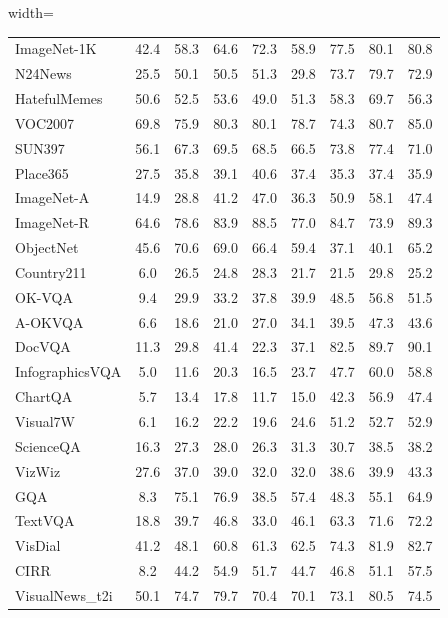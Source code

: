 \begin{table}[!ht]
\begin{adjustbox}{width=\textwidth}
\begin{tabular}{l|cccccccc}
        ImageNet-1K & 42.4 & 58.3 & 64.6 & 72.3 & 58.9 & 77.5 & 80.1 & 80.8 \\ 
        N24News & 25.5 & 50.1 & 50.5 & 51.3 & 29.8 & 73.7 & 79.7 & 72.9 \\ 
        HatefulMemes & 50.6 & 52.5 & 53.6 & 49.0 & 51.3 & 58.3 & 69.7 & 56.3 \\ 
        VOC2007 & 69.8 & 75.9 & 80.3 & 80.1 & 78.7 & 74.3 & 80.7 & 85.0 \\ 
        SUN397 & 56.1 & 67.3 & 69.5 & 68.5 & 66.5 & 73.8 & 77.4 & 71.0 \\ 
        Place365 & 27.5 & 35.8 & 39.1 & 40.6 & 37.4 & 35.3 & 37.4 & 35.9 \\ 
        ImageNet-A & 14.9 & 28.8 & 41.2 & 47.0 & 36.3 & 50.9 & 58.1 & 47.4 \\ 
        ImageNet-R & 64.6 & 78.6 & 83.9 & 88.5 & 77.0 & 84.7 & 73.9 & 89.3 \\ 
        ObjectNet & 45.6 & 70.6 & 69.0 & 66.4 & 59.4 & 37.1 & 40.1 & 65.2 \\ 
        Country211 & 6.0 & 26.5 & 24.8 & 28.3 & 21.7 & 21.5 & 29.8 & 25.2 \\ 
        OK-VQA & 9.4 & 29.9 & 33.2 & 37.8 & 39.9 & 48.5 & 56.8 & 51.5 \\ 
        A-OKVQA & 6.6 & 18.6 & 21.0 & 27.0 & 34.1 & 39.5 & 47.3 & 43.6 \\ 
        DocVQA & 11.3 & 29.8 & 41.4 & 22.3 & 37.1 & 82.5 & 89.7 & 90.1 \\ 
        InfographicsVQA & 5.0 & 11.6 & 20.3 & 16.5 & 23.7 & 47.7 & 60.0 & 58.8 \\ 
        ChartQA & 5.7 & 13.4 & 17.8 & 11.7 & 15.0 & 42.3 & 56.9 & 47.4 \\ 
        Visual7W & 6.1 & 16.2 & 22.2 & 19.6 & 24.6 & 51.2 & 52.7 & 52.9 \\ 
        ScienceQA & 16.3 & 27.3 & 28.0 & 26.3 & 31.3 & 30.7 & 38.5 & 38.2 \\ 
        VizWiz & 27.6 & 37.0 & 39.0 & 32.0 & 32.0 & 38.6 & 39.9 & 43.3 \\ 
        GQA & 8.3 & 75.1 & 76.9 & 38.5 & 57.4 & 48.3 & 55.1 & 64.9 \\ 
        TextVQA & 18.8 & 39.7 & 46.8 & 33.0 & 46.1 & 63.3 & 71.6 & 72.2 \\ 
        VisDial & 41.2 & 48.1 & 60.8 & 61.3 & 62.5 & 74.3 & 81.9 & 82.7 \\ 
        CIRR & 8.2 & 44.2 & 54.9 & 51.7 & 44.7 & 46.8 & 51.1 & 57.5 \\ 
        VisualNews\_t2i & 50.1 & 74.7 & 79.7 & 70.4 & 70.1 & 73.1 & 80.5 & 74.5 \\ 

\end{tabular}
\end{adjustbox}
\end{table}
